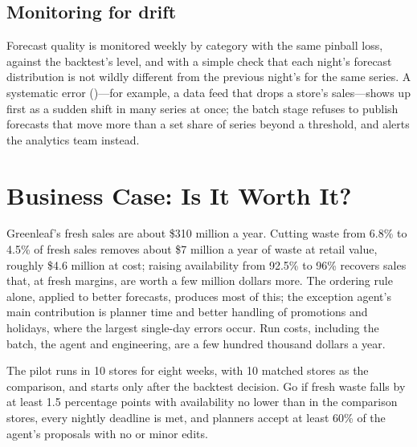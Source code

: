 \subsection{Monitoring for drift}

Forecast quality is monitored weekly by category with the same pinball loss, against the backtest's level, and with a simple check that each night's forecast distribution is not wildly different from the previous night's for the same series. A systematic error ()---for example, a data feed that drops a store's sales---shows up first as a sudden shift in many series at once; the batch stage refuses to publish forecasts that move more than a set share of series beyond a threshold, and alerts the analytics team instead.

\section{Business Case: Is It Worth It?}
\label{sec:fc-business}

Greenleaf's fresh sales are about \$310 million a year. Cutting waste from 6.8\% to 4.5\% of fresh sales removes about \$7 million a year of waste at retail value, roughly \$4.6 million at cost; raising availability from 92.5\% to 96\% recovers sales that, at fresh margins, are worth a few million dollars more. The ordering rule alone, applied to better forecasts, produces most of this; the exception agent's main contribution is planner time and better handling of promotions and holidays, where the largest single-day errors occur. Run costs, including the batch, the agent and engineering, are a few hundred thousand dollars a year.

The pilot runs in 10 stores for eight weeks, with 10 matched stores as the comparison, and starts only after the backtest decision. Go if fresh waste falls by at least 1.5 percentage points with availability no lower than in the comparison stores, every nightly deadline is met, and planners accept at least 60\% of the agent's proposals with no or minor edits.

